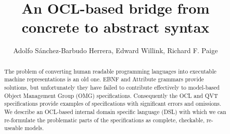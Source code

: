 \documentclass{llncs}
\begin{document}
\title{An OCL-based bridge from concrete to abstract syntax}

\author{Adolfo S\'{a}nchez-Barbudo Herrera, Edward Willink,
Richard F. Paige}

\maketitle

\begin{abstract}
The problem of converting human readable programming languages into executable machine representations is an old one. EBNF and Attribute grammars provide solutions, but unfortunately they have failed to contribute effectively to model-based Object Management Group (OMG)  specifications. Consequently the OCL and QVT specifications provide examples of specifications with significant errors and omissions.  We describe an OCL-based internal domain specific language (DSL) with which we can re-formulate the problematic parts of the specifications as complete, checkable, re-useable models.

\end{abstract}
\end{document}
